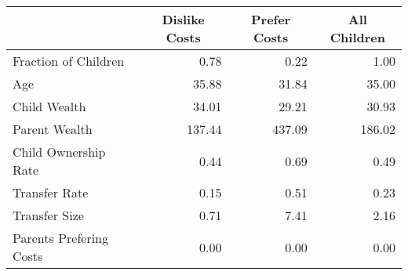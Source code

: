 \begin{tabular}{l rrr}
\toprule
  &  \multicolumn{1}{c}{Dislike Costs } & \multicolumn{1}{c}{Prefer Costs } & \multicolumn{1}{c}{All Children}\\
\midrule
Fraction of Children & 0.78 & 0.22 & 1.00\\
Age & 35.88 & 31.84 & 35.00\\
Child Wealth & 34.01 & 29.21 & 30.93\\
Parent Wealth & 137.44 & 437.09 & 186.02\\
Child Ownership Rate & 0.44 & 0.69 & 0.49\\
Transfer Rate & 0.15 & 0.51 & 0.23\\
Transfer Size & 0.71 & 7.41 & 2.16\\
Parents Prefering Costs & 0.00 & 0.00 & 0.00\\
\bottomrule
\end{tabular}
